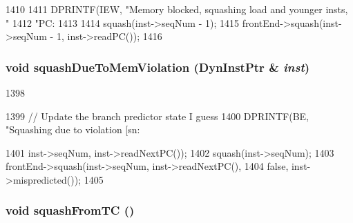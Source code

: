 \begin{DoxyCode}
1410 {
1411     DPRINTF(IEW, "Memory blocked, squashing load and younger insts, "
1412             "PC: %
1413 
1414     squash(inst->seqNum - 1);
1415     frontEnd->squash(inst->seqNum - 1, inst->readPC());
1416 }
\end{DoxyCode}
\hypertarget{classLWBackEnd_a493d3b3596dc6e17cc56990a4e71602d}{
\subsubsection[{squashDueToMemViolation}]{\setlength{\rightskip}{0pt plus 5cm}void squashDueToMemViolation ({\bf DynInstPtr} \& {\em inst})}}
\label{classLWBackEnd_a493d3b3596dc6e17cc56990a4e71602d}



\begin{DoxyCode}
1398 {
1399     // Update the branch predictor state I guess
1400     DPRINTF(BE, "Squashing due to violation [sn:%
      
1401             inst->seqNum, inst->readNextPC());
1402     squash(inst->seqNum);
1403     frontEnd->squash(inst->seqNum, inst->readNextPC(),
1404                      false, inst->mispredicted());
1405 }
\end{DoxyCode}
\hypertarget{classLWBackEnd_a24cd8db837a73b879041bf33da7b2064}{
\subsubsection[{squashFromTC}]{\setlength{\rightskip}{0pt plus 5cm}void squashFromTC ()}}
\label{classLWBackEnd_a24cd8db837a73b879041bf33da7b2064}



